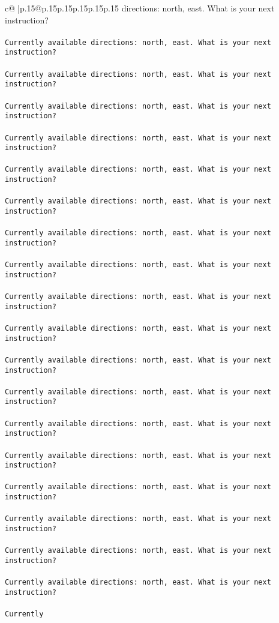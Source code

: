 \documentclass{article}
\begin{document}
{\begin{supertabular}{c@{$\;$}|p{.15\linewidth}@{}p{.15\linewidth}p{.15\linewidth}p{.15\linewidth}p{.15\linewidth}p{.15\linewidth}}
{{{directions: north, east. What is your next instruction?\\ \tt \\ \tt Currently available directions: north, east. What is your next instruction?\\ \tt \\ \tt Currently available directions: north, east. What is your next instruction?\\ \tt \\ \tt Currently available directions: north, east. What is your next instruction?\\ \tt \\ \tt Currently available directions: north, east. What is your next instruction?\\ \tt \\ \tt Currently available directions: north, east. What is your next instruction?\\ \tt \\ \tt Currently available directions: north, east. What is your next instruction?\\ \tt \\ \tt Currently available directions: north, east. What is your next instruction?\\ \tt \\ \tt Currently available directions: north, east. What is your next instruction?\\ \tt \\ \tt Currently available directions: north, east. What is your next instruction?\\ \tt \\ \tt Currently available directions: north, east. What is your next instruction?\\ \tt \\ \tt Currently available directions: north, east. What is your next instruction?\\ \tt \\ \tt Currently available directions: north, east. What is your next instruction?\\ \tt \\ \tt Currently available directions: north, east. What is your next instruction?\\ \tt \\ \tt Currently available directions: north, east. What is your next instruction?\\ \tt \\ \tt Currently available directions: north, east. What is your next instruction?\\ \tt \\ \tt Currently available directions: north, east. What is your next instruction?\\ \tt \\ \tt Currently available directions: north, east. What is your next instruction?\\ \tt \\ \tt Currently available directions: north, east. What is your next instruction?\\ \tt \\ \tt Currently }}}
\end{supertabular}}
\end{document}
